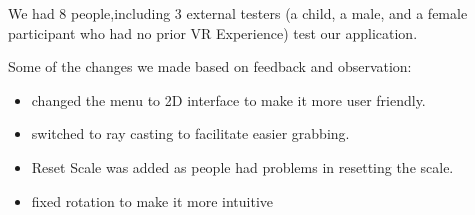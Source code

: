 We had 8 people,including  3 external testers (a child, a male, and a female participant who had no prior VR Experience) test our application.

Some of the changes we made based on feedback and observation:
\begin{itemize}
  \item changed the menu to 2D interface to make it more user friendly.
  \item switched to ray casting to facilitate easier grabbing.
  \item Reset Scale was added as people had problems in resetting the scale.
  \item fixed rotation to make it more intuitive
\end{itemize}